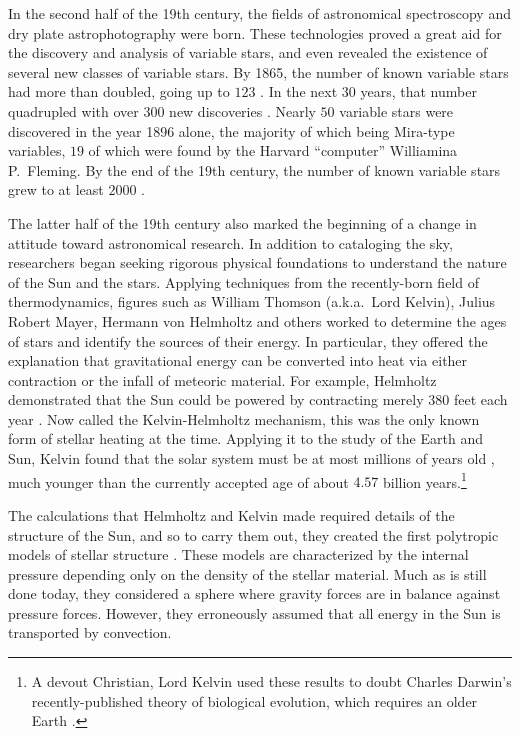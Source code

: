 In the second half of the 19th century, the fields of astronomical spectroscopy and dry plate astrophotography were born. 
These technologies proved a great aid for the discovery and analysis of variable stars, and even revealed the existence of several new classes of variable stars. 
By 1865, the number of known variable stars had more than doubled, going up to $123$ \citep{1865AN.....63..117C}. %
In the next $30$ years, that number quadrupled with over $300$ new discoveries \citep[e.g.,][]{1997JAVSO..25..115H}. 
Nearly $50$ variable stars were discovered in the year 1896 alone, the majority of which being Mira-type variables, $19$ of which were found by the Harvard ``computer'' Williamina P.~Fleming. 
By the end of the 19th century, the number of known variable stars grew to at least $2000$ \citep[e.g.,][]{Samus2017}. %



The latter half of the 19th century also marked the beginning of a change in attitude toward astronomical research. 
In addition to cataloging the sky, researchers began seeking rigorous physical foundations to understand the nature of the Sun and the stars. 
Applying techniques from the recently-born field of thermodynamics, figures such as William Thomson (a.k.a.\ Lord Kelvin), Julius Robert Mayer, Hermann von Helmholtz and others worked to determine the ages of stars and identify the sources of their energy. %
In particular, they offered the explanation that gravitational energy can be converted into heat via either contraction or the infall of meteoric material. 
For example, Helmholtz demonstrated that the Sun could be powered by contracting merely $380$ feet each year \citep[e.g.,][]{ARNY1990211}. 
Now called the Kelvin-Helmholtz mechanism, this was the only known form of stellar heating at the time. 
Applying it to the study of the Earth and Sun, Kelvin found that the solar system must be at most millions of years old \citep[e.g.,][]{1895Natur..51..438K}, much younger than the currently accepted age of about $4.57$ billion years.\footnote{ A devout Christian, Lord Kelvin used these results to doubt Charles Darwin's recently-published theory of biological evolution, which requires an older Earth \citep{darwin}.}

The calculations that Helmholtz and Kelvin made required details of the structure of the Sun, and so to carry them out, they created the first polytropic models of stellar structure \citep[e.g.,][]{ARNY1990211}. 
These models are characterized by the internal pressure depending only on the density of the stellar material. 
Much as is still done today, they considered a sphere where gravity forces are in balance against pressure forces. 
However, they erroneously assumed that all energy in the Sun is transported by convection. 

